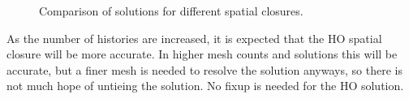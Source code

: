 \begin{figure}[H]
    \centering
    \caption{\label{fig:smooth_compare} Comparison of solutions for different spatial closures.}
\end{figure}

\begin{table}[H]

\end{table}

As the number of histories are increased, it is expected that the HO spatial closure will
be more accurate. In higher mesh counts and solutions this will be accurate, but a finer
mesh is needed to resolve the solution anyways, so there is not much hope of untieing the
solution.  No fixup is needed for the HO solution.




